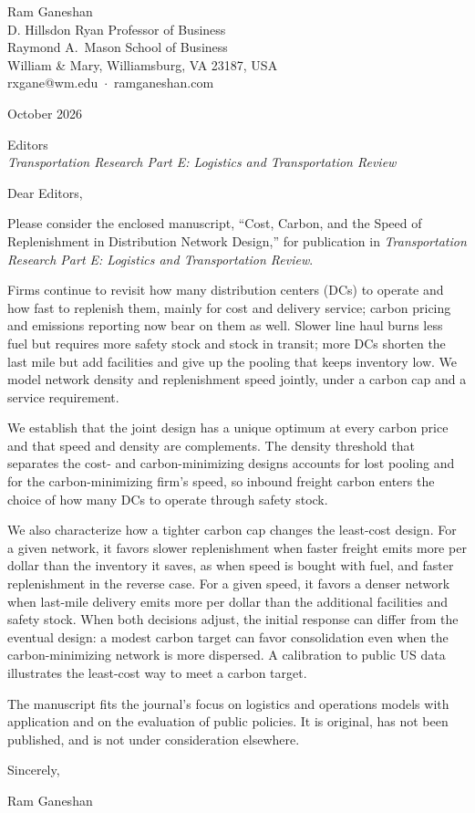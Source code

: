 \documentclass[11pt]{article}
\begin{document}
Ram Ganeshan\\
D. Hillsdon Ryan Professor of Business\\
Raymond A.\ Mason School of Business\\
William \& Mary, Williamsburg, VA 23187, USA\\
rxgane@wm.edu\ $\cdot$\ ramganeshan.com

\bigskip
October 2026

\bigskip
Editors\\
\emph{Transportation Research Part E: Logistics and Transportation Review}

\bigskip
Dear Editors,

Please consider the enclosed manuscript, ``Cost, Carbon, and the Speed of Replenishment in Distribution
Network Design,'' for publication in \emph{Transportation Research Part E: Logistics and Transportation Review}.

Firms continue to revisit how many distribution centers (DCs) to operate and how fast to replenish them, mainly
for cost and delivery service; carbon pricing and emissions reporting now bear on them as well. Slower
line haul burns less fuel but requires more safety stock and stock in transit; more DCs shorten the last mile
but add facilities and give up the pooling that keeps inventory low. We model network density and replenishment
speed jointly, under a carbon cap and a service requirement.

We establish that the joint design has a unique optimum at every carbon price and that speed and density are
complements. The density threshold that separates the cost- and carbon-minimizing designs accounts for lost
pooling and for the carbon-minimizing firm's speed, so inbound freight carbon enters the choice of how
many DCs to operate through safety stock.

We also characterize how a tighter carbon cap changes the least-cost design. For a given network, it favors slower
replenishment when faster freight emits more per dollar than the inventory it saves, as when speed is
bought with fuel, and faster replenishment in the reverse case. For a given speed, it favors a denser network when
last-mile delivery emits more per dollar than the additional facilities and safety stock. When both decisions
adjust, the initial response can differ from the eventual design: a modest carbon target can favor consolidation
even when the carbon-minimizing network is more dispersed. A calibration to public US data illustrates the
least-cost way to meet a carbon target.

The manuscript fits the journal's focus on logistics and operations models with application and on the
evaluation of public policies. It is original, has not been published, and is not under consideration elsewhere.

\bigskip
Sincerely,

\bigskip
Ram Ganeshan
\end{document}
